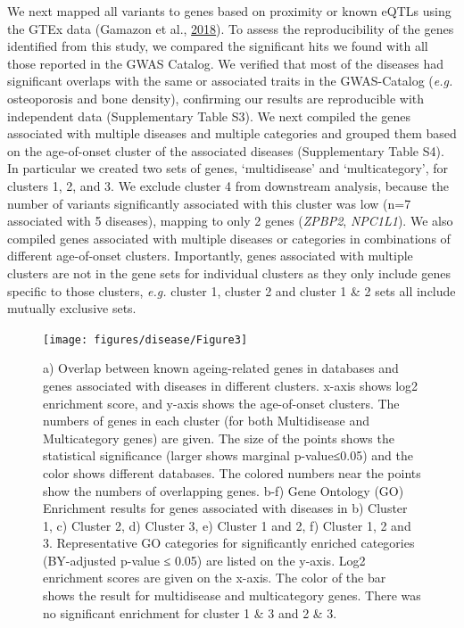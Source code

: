 \documentclass[12pt,twoside]{unicam}
\begin{document}
We next mapped all variants to genes based on proximity or known eQTLs using the GTEx data (Gamazon et al., \protect\hyperlink{ref-Gamazon2018}{2018}). To assess the reproducibility of the genes identified from this study, we compared the significant hits we found with all those reported in the GWAS Catalog. We verified that most of the diseases had significant overlaps with the same or associated traits in the GWAS-Catalog (\emph{e.g.} osteoporosis and bone density), confirming our results are reproducible with independent data (Supplementary Table S3). We next compiled the genes associated with multiple diseases and multiple categories and grouped them based on the age-of-onset cluster of the associated diseases (Supplementary Table S4). In particular we created two sets of genes, `multidisease' and `multicategory', for clusters 1, 2, and 3. We exclude cluster 4 from downstream analysis, because the number of variants significantly associated with this cluster was low (n=7 associated with 5 diseases), mapping to only 2 genes (\emph{ZPBP2}, \emph{NPC1L1}). We also compiled genes associated with multiple diseases or categories in combinations of different age-of-onset clusters. Importantly, genes associated with multiple clusters are not in the gene sets for individual clusters as they only include genes specific to those clusters, \emph{e.g.} cluster 1, cluster 2 and cluster 1 \& 2 sets all include mutually exclusive sets.

\begin{figure}

{\centering \texttt{[image: figures/disease/Figure3]} 

}

\caption[Enrichment analyses for the genes associated with different age-of-onset clusters and ageing-related genes or gene ontology categories.]{a) Overlap between known ageing-related genes in databases and genes associated with diseases in different clusters. x-axis shows log2 enrichment score, and y-axis shows the age-of-onset clusters. The numbers of genes in each cluster (for both Multidisease and Multicategory genes) are given. The size of the points shows the statistical significance (larger shows marginal p-value≤0.05) and the color shows different databases. The colored numbers near the points show the numbers of overlapping genes. b-f) Gene Ontology (GO) Enrichment results for genes associated with diseases in b) Cluster 1, c) Cluster 2, d) Cluster 3, e) Cluster 1 and 2, f) Cluster 1, 2 and 3. Representative GO categories for significantly enriched categories (BY-adjusted p-value ≤ 0.05) are listed on the y-axis. Log2 enrichment scores are given on the x-axis. The color of the bar shows the result for multidisease and multicategory genes. There was no significant enrichment for cluster 1 \& 3 and 2 \& 3.}\label{fig:disFig3}
\end{figure}
\end{document}
